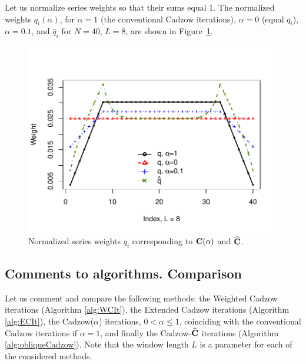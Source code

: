 \documentclass[sii]{ipart}
\begin{document}
Let us normalize series weights so that their sums equal 1.
The normalized weights $q_i(\alpha)$, for $\alpha = 1$ (the conventional Cadzow iterations), $\alpha = 0$ (equal $q_i$), $\alpha = 0.1$,
and $\hat{q}_i$ for $N = 40$, $L = 8$, are shown in Figure~\ref{img_weights}.
\begin{figure}
		\includegraphics[width =\columnwidth]{weights.pdf}\caption{Normalized series weights $q_i$ corresponding to $\mathbf{C}(\alpha)$ and $\widehat{\mathbf{C}}$.}\label{img_weights}
\end{figure}
	
	\subsection{Comments to algorithms. Comparison}
\label{sec:comments}
	
	Let us comment and compare the following methods: the Weighted Cadzow iterations (Algorithm \ref{alg:WCIt}), the Extended Cadzow iterations (Algorithm \ref{alg:ECIt}), the Cadzow($\alpha$) iterations, $0< \alpha \leq 1$, coinciding with the conventional Cadzow iterations if $\alpha=1$,
	and finally the Cadzow-$\widehat{\mathbf{C}}$ iterations (Algorithm \ref{alg:obliqueCadzow}).
	Note that the window length $L$ is a parameter for each of the considered methods.
	
\end{document}
